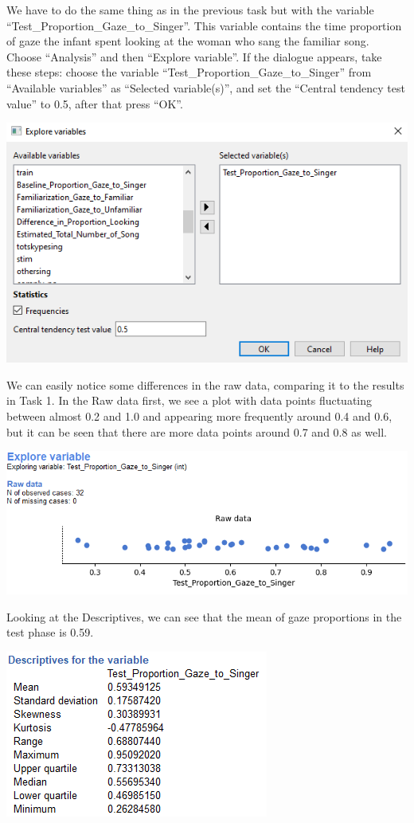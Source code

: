 \documentclass[
]{book}
\begin{document}
We have to do the same thing as in the previous task but with the variable ``Test\_Proportion\_Gaze\_to\_Singer''. This variable contains the time proportion of gaze the infant spent looking at the woman who sang the familiar song. Choose ``Analysis'' and then ``Explore variable''. If the dialogue appears, take these steps: choose the variable ``Test\_Proportion\_Gaze\_to\_Singer'' from ``Available variables'' as ``Selected variable(s)'', and set the ``Central tendency test value'' to 0.5, after that press ``OK''.

\includegraphics{img/ch6/6.5expvarwindow.png}

We can easily notice some differences in the raw data, comparing it to the results in Task 1. In the Raw data first, we see a plot with data points fluctuating between almost 0.2 and 1.0 and appearing more frequently around 0.4 and 0.6, but it can be seen that there are more data points around 0.7 and 0.8 as well.

\includegraphics{img/ch6/6.5expvarraw.png}

Looking at the Descriptives, we can see that the mean of gaze proportions in the test phase is 0.59.

\includegraphics{img/ch6/6.5descr.png}
\end{document}

